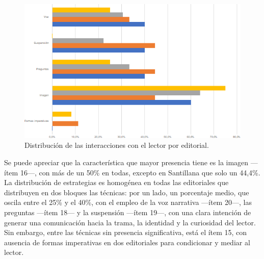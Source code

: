 \documentclass[spanish]{textolivre}
\begin{document}
\begin{figure}[htbp]
\centering
\begin{minipage}{.8\textwidth}
 \includegraphics[width=\textwidth]{figura04.png}
 \caption{Distribución de las interacciones con el lector por editorial.}
 \label{fig04}
\end{minipage}
\end{figure}

Se puede apreciar que la característica que mayor presencia tiene es la imagen —ítem 16—, con más de un 50\% en todas, excepto en Santillana que solo un 44,4\%. La distribución de estrategias es homogénea en todas las editoriales que distribuyen en dos bloques las técnicas: por un lado, un porcentaje medio, que oscila entre el 25\% y el 40\%, con el empleo de la voz narrativa —ítem 20—, las preguntas —ítem 18— y la suspensión —ítem 19—, con una clara intención de generar una comunicación hacia la trama, la identidad y la curiosidad del lector. Sin embargo, entre las técnicas sin presencia significativa, está el ítem 15, con ausencia de formas imperativas en dos editoriales para condicionar y mediar al lector.
\end{document}

